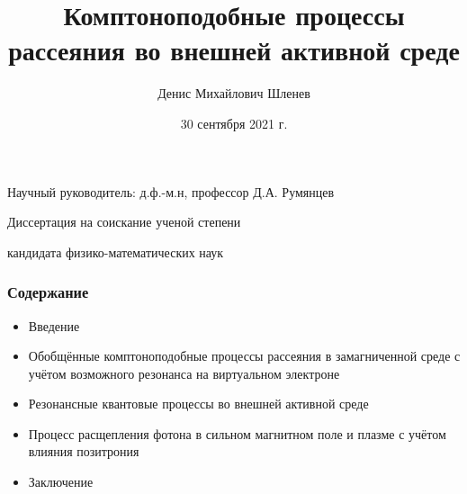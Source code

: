 \documentclass{beamer}
\title{Комптоноподобные процессы рассеяния во внешней активной среде}
\author{Денис Михайлович Шленев}
\institute[Ярославский государственный университет им. П.Г. Демидова] 
{
Ярославский государственный университет им. П.Г. Демидова\\ 
\medskip
}
\date{30 сентября 2021 г.}
\begin{document}
\begin{frame}
\titlepage

\begin{center}

\vspace*{-4mm} 

{\small {Научный руководитель: д.ф.-м.н, профессор Д.А. Румянцев}} 

\vspace*{4mm} 

{\small Диссертация на соискание ученой степени 

кандидата физико-математических наук}
 

\end{center}
\end{frame}


\begin{frame}
\frametitle{Содержание}
\begin{itemize}

\item Введение

\item Обобщённые комптоноподобные процессы
рассеяния в замагниченной среде с учётом
возможного резонанса на виртуальном электроне

\item Резонансные квантовые процессы во внешней активной среде

\item Процесс расщепления фотона в сильном
магнитном поле и плазме с учётом влияния позитрония 

\item Заключение

\end{itemize}
 
\end{frame}
\end{document}
